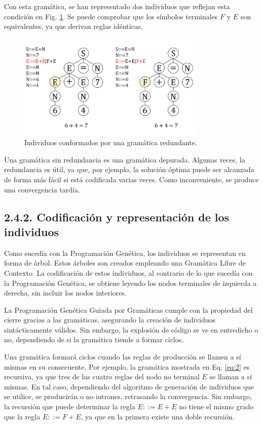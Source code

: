 \documentclass[spanish,a4paper,12pt,twoside]{report}
\begin{document}
    Con esta gramática, se han representado dos individuos que reflejan esta condición en Fig. \ref{fig:6}. Se puede comprobar que los símbolos terminales $F$ y $E$ son equivalentes, ya que derivan reglas idénticas. \par
    \begin{figure}[H]
      \centering
      \includegraphics[width = 0.8\textwidth]{resources/Fig6.pdf}
      \caption{Individuos conformados por una gramática redundante.}
      \label{fig:6}
    \end{figure} \par
    Una gramática sin redundancia es una gramática depurada. Algunas veces, la redundancia es útil, ya que, por ejemplo, la solución óptima puede ser alcanzada de forma más fácil si está codificada varias veces. Como inconveniente, se produce una convergencia tardía.
    
    \subsection*{\large 2.4.2. Codificación y representación de los individuos}
    Como sucedía con la Programación Genética, los individuos se representan en forma de árbol. Estos árboles son creados empleando una Gramática Libre de Contexto. La codificación de estos individuos, al contrario de lo que sucedía con la Programación Genética, se obtiene leyendo los nodos terminales de izquierda a derecha, sin incluir los nodos interiores. \par
    La Programación Genética Guiada por Gramáticas cumple con la propiedad del cierre gracias a las gramáticas, asegurando la creación de individuos sintácticamente válidos. Sin embargo, la explosión de código se ve en entredicho o no, dependiendo de si la gramática tiende a formar ciclos. \par
    Una gramática formará ciclos cuando las reglas de producción se llamen a sí mismas en su consecuente. Por ejemplo, la gramática mostrada en Eq. \ref{eq:2} es recursiva, ya que tres de las cuatro reglas del nodo no terminal $E$ se llaman a sí mismas. En tal caso, dependiendo del algoritmo de generación de individuos que se utilice, se producirán o no intrones, retrasando la convergencia. Sin embargo, la recursión que puede determinar la regla $E ::= E + E$ no tiene el mismo grado que la regla $E ::= F + E$, ya que en la primera existe una doble recursión.
    
\end{document}
